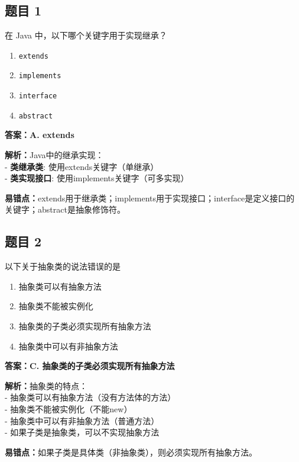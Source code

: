\documentclass[12pt,a4paper]{ctexart}
\begin{document}
\subsection*{题目 1}
在 Java 中，以下哪个关键字用于实现继承？
\begin{enumerate}[label=\Alph*.]
	\item \texttt{extends}
	\item \texttt{implements}
	\item \texttt{interface}
	\item \texttt{abstract}
\end{enumerate}

\begin{answerbox}
	\textbf{答案：A. extends}

	\textbf{解析：}Java中的继承实现：\\
	- \textbf{类继承类}: 使用extends关键字（单继承）\\
	- \textbf{类实现接口}: 使用implements关键字（可多实现）

	\textbf{易错点：}extends用于继承类；implements用于实现接口；interface是定义接口的关键字；abstract是抽象修饰符。
\end{answerbox}

\subsection*{题目 2}
以下关于抽象类的说法错误的是
\begin{enumerate}[label=\Alph*.]
	\item 抽象类可以有抽象方法
	\item 抽象类不能被实例化
	\item 抽象类的子类必须实现所有抽象方法
	\item 抽象类中可以有非抽象方法
\end{enumerate}

\begin{answerbox}
	\textbf{答案：C. 抽象类的子类必须实现所有抽象方法}

	\textbf{解析：}抽象类的特点：\\
	- 抽象类可以有抽象方法（没有方法体的方法）\\
	- 抽象类不能被实例化（不能new）\\
	- 抽象类中可以有非抽象方法（普通方法）\\
	- 如果子类是抽象类，可以不实现抽象方法

	\textbf{易错点：}如果子类是具体类（非抽象类），则必须实现所有抽象方法。
\end{answerbox}
\end{document}
